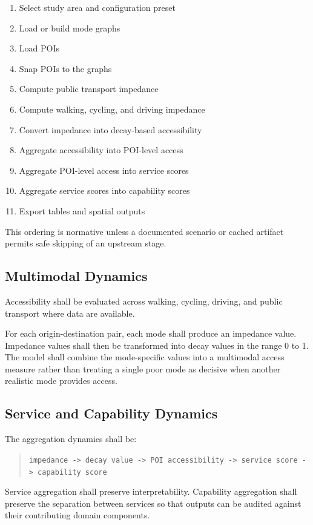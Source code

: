 \documentclass[11pt]{article}
\begin{document}
\begin{enumerate}
  \item Select study area and configuration preset
  \item Load or build mode graphs
  \item Load POIs
  \item Snap POIs to the graphs
  \item Compute public transport impedance
  \item Compute walking, cycling, and driving impedance
  \item Convert impedance into decay-based accessibility
  \item Aggregate accessibility into POI-level access
  \item Aggregate POI-level access into service scores
  \item Aggregate service scores into capability scores
  \item Export tables and spatial outputs
\end{enumerate}

This ordering is normative unless a documented scenario or cached artifact permits safe skipping of an upstream stage.

\subsection*{Multimodal Dynamics}

Accessibility shall be evaluated across walking, cycling, driving, and public transport where data are available.

For each origin-destination pair, each mode shall produce an impedance value. Impedance values shall then be transformed into decay values in the range 0 to 1. The model shall combine the mode-specific values into a multimodal access measure rather than treating a single poor mode as decisive when another realistic mode provides access.

\subsection*{Service and Capability Dynamics}

The aggregation dynamics shall be:

\begin{quote}
\texttt{impedance -> decay value -> POI accessibility -> service score -> capability score}
\end{quote}

Service aggregation shall preserve interpretability. Capability aggregation shall preserve the separation between services so that outputs can be audited against their contributing domain components.
\end{document}

